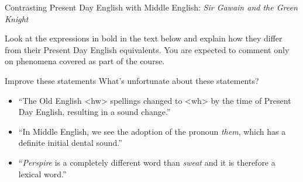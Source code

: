 \begin{exercises}{Contrasting Present Day English with Middle English: \textit{Sir Gawain and the Green Knight}}\label{ex-Gawain}

\chili{}

Look at the expressions in bold in the text below and explain how they differ from their Present Day English equivalents. You are expected to comment only on phenomena covered as part of the course.

\noindent
{}

\end{exercises}

\begin{exercises}{Improve these statements}\label{ex-statements-ME}
\noindent What's unfortunate about these statements?
\begin{itemize}
\item ``The Old English <hw> spellings changed to <wh> by the time of Present Day English, resulting in a sound change.''
\item ``In Middle English, we see the adoption of the pronoun \textit{them}, which has a definite initial dental sound.''
\item ``\textit{Perspire} is a completely different word than \textit{sweat} and it is therefore a lexical word.''
\end{itemize}
\end{exercises}


